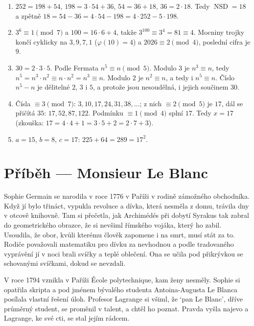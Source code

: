 \begin{solution}
  \begin{enumerate}[label=(\alph*)]
    \item $252 = 198 + 54$, $198 = 3\cdot 54 + 36$, $54 = 36 + 18$, $36 = 2\cdot 18$. Tedy $\operatorname{NSD} = 18$ a zpětně $18 = 54 - 36 = 4\cdot 54 - 198 = 4\cdot 252 - 5\cdot 198$.
    \item $3^6\equiv 1\pmod 7$ a $100 = 16\cdot 6 + 4$, takže $3^{100}\equiv 3^4 = 81\equiv 4$. Mocniny trojky končí cyklicky na $3, 9, 7, 1$ ($\varphi(10) = 4$) a $2026\equiv 2\pmod 4$, poslední cifra je $9$.
    \item $30 = 2\cdot 3\cdot 5$. Podle Fermata $n^5\equiv n\pmod 5$. Modulo $3$ je $n^3\equiv n$, tedy $n^5 = n^3\cdot n^2\equiv n\cdot n^2 = n^3\equiv n$. Modulo $2$ je $n^2\equiv n$, a tedy i $n^5\equiv n$. Číslo $n^5 - n$ je dělitelné $2$, $3$ i $5$, a protože jsou nesoudělná, i jejich součinem $30$.
    \item Čísla $\equiv 3\pmod 7$: $3, 10, 17, 24, 31, 38, \ldots$; z nich $\equiv 2\pmod 5$ je $17$, dál se přičítá $35$: $17, 52, 87, 122$. Podmínku $\equiv 1\pmod 4$ splní $17$. Tedy $x = 17$ (zkouška: $17 = 4\cdot 4 + 1 = 3\cdot 5 + 2 = 2\cdot 7 + 3$).
    \item $a = 15$, $b = 8$, $c = 17$: $225 + 64 = 289 = 17^2$.
  \end{enumerate}
\end{solution}

\section{Příběh --- Monsieur Le Blanc}

Sophie Germain se narodila v roce 1776 v Paříži v rodině zámožného obchodníka. Když jí bylo třináct, vypukla revoluce a dívka, která nesměla z domu, trávila dny v otcově knihovně. Tam si přečetla, jak Archimédés při dobytí Syrakus tak zabral do geometrického obrazce, že si nevšiml římského vojáka, který ho zabil. Usoudila, že obor, kvůli kterému člověk zapomene i na smrt, musí stát za to. Rodiče považovali matematiku pro dívku za nevhodnou a podle tradovaného vyprávění jí v noci brali svíčky a teplé oblečení. Ona se učila pod přikrývkou se schovanými svíčkami, dokud se nevzdali.

V roce 1794 vznikla v Paříži École polytechnique, kam ženy nesměly. Sophie si opatřila skripta a pod jménem bývalého studenta Antoina-Augusta Le Blanca posílala vlastní řešení úloh. Profesor Lagrange si všiml, že `pan Le Blanc', dříve průměrný student, se proměnil v talent, a chtěl ho poznat. Pravda vyšla najevo a Lagrange, ke své cti, se stal jejím rádcem.

